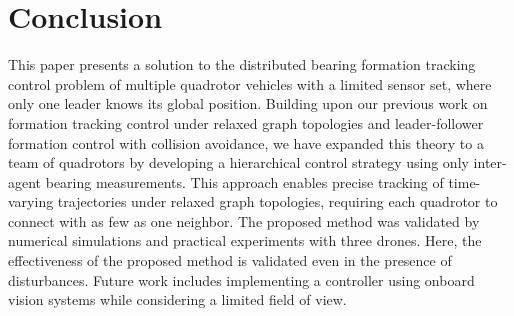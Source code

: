 \section{Conclusion} \label{sec:conclusion}
This paper presents a solution to the distributed bearing formation tracking control problem of multiple quadrotor vehicles with a limited sensor set, where only one leader knows its global position. Building upon our previous work on formation tracking control under relaxed graph topologies and leader-follower formation control with collision avoidance, we have expanded this theory to a team of quadrotors by developing a hierarchical control strategy using only inter-agent bearing measurements. This approach enables precise tracking of time-varying trajectories under relaxed graph topologies, requiring each quadrotor to connect with as few as one neighbor. The proposed method was validated by numerical simulations and practical experiments with three drones. Here, the effectiveness of the proposed method is validated even in the presence of disturbances. Future work includes implementing a controller using onboard vision systems while considering a limited field of view.